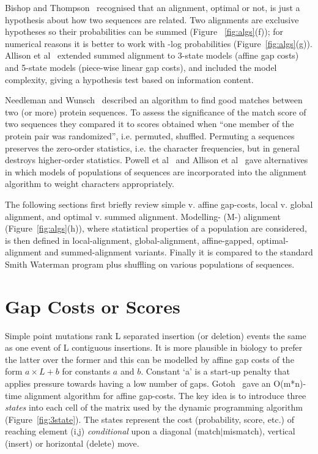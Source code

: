 \documentclass[letterpaper,11pt,oneside]{article}
\begin{document}
Bishop and Thompson~\cite{bishop86} recognised that an alignment, optimal or not,
is just a hypothesis about how two sequences are related.
Two alignments are exclusive hypotheses so their probabilities
can be summed (Figure ~\ref{fig:algs}(f));
for numerical reasons it is better to work with -log probabilities (Figure~\ref{fig:algs}(g)).
Allison et al~\cite{allison92a} extended summed alignment to
3-state models (affine gap costs) and
5-state models (piece-wise linear gap costs),
and included the model complexity,
giving a hypothesis test based on information content.

Needleman and Wunsch~\cite{needleman70} described an algorithm to find good matches between
two (or more) protein sequences.
To assess the significance of the match score of two sequences
they compared it to scores obtained
when ``one member of the protein pair was randomized'', i.e. permuted, shuffled.
Permuting a sequences preserves the zero-order statistics,
i.e. the character frequencies, but
in general destroys higher-order statistics.
Powell et al~\cite{powell98b} and Allison et al~\cite{allison99} gave alternatives in which models
of populations of sequences are incorporated into the alignment algorithm
to weight characters appropriately.

The following sections first briefly review
simple v. affine gap-costs,
local v. global alignment, and
optimal v. summed alignment.
Modelling- (M-) alignment (Figure~\ref{fig:algs}(h)), where statistical properties of a
population are considered, is then defined in
local-alignment, global-alignment, affine-gapped, optimal-alignment and summed-alignment variants.
Finally it is compared to the standard Smith Waterman program plus shuffling
on various populations of sequences.



\section{Gap Costs or Scores}

Simple point mutations rank L separated insertion (or deletion) events
the same as one event of L contiguous insertions.
It is more plausible in biology to prefer the latter over the former and
this can be modelled by affine gap costs of the form $a \times L+b$ for
constants $a$ and $b$.
Constant `a' is a start-up penalty that applies pressure towards having
a low number of gaps.
Gotoh~\cite{gotoh82} gave an O(m*n)-time alignment algorithm for affine gap-costs.
The key idea is to introduce three {\em states} into  each cell of
the matrix used by the dynamic programming algorithm (Figure~\ref{fig:3state}).
The states represent the cost (probability, score, etc.) of reaching
element (i,j) {\em conditional} upon a
diagonal (match$|$mismatch), vertical (insert) or horizontal (delete) move.
\end{document}
